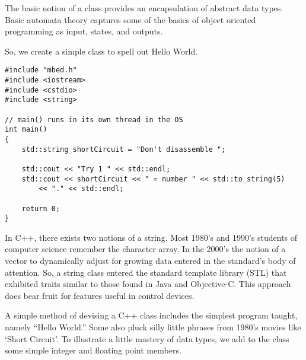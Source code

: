 \documentclass{article}
\begin{document}
The basic notion of a class provides an encapsulation of abstract data types.   Basic automata theory captures some of the basics of object oriented programming as input, states, and outputs. 

So, we create a simple class to spell out Hello World. %


\begin{lstlisting}
#include "mbed.h"
#include <iostream>
#include <cstdio>
#include <string>

// main() runs in its own thread in the OS
int main()
{
    std::string shortCircuit = "Don't disassemble ";
   
    std::cout << "Try 1 " << std::endl;
    std::cout << shortCircuit << " = number " << std::to_string(5) 
		<< "." << std::endl;

	return 0;
}
\end{lstlisting}


In C++, there exists two notions of a string.  Most 1980's and 1990's students of computer science remember the character array.  In the 2000's the notion of a vector to dynamically adjust for growing data entered in the standard's body of attention.  So, a string class entered the standard template library (STL) that exhibited traits similar to those found in Java and Objective-C.  This approach does bear fruit for features useful in control devices.

A simple method of devising a C++ class includes the simplest program taught, namely ``Hello World.''  Some also pluck silly little phrases from 1980's movies like `Short Circuit'.  To illustrate a little mastery of data types, we add to the class some simple integer and floating point members.  
\end{document}
